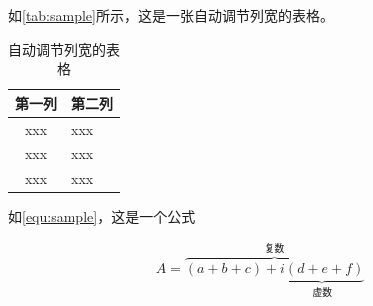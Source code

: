 \par 如\autoref{tab:sample}所示，这是一张自动调节列宽的表格。

\begin{table}[htbp]
    \caption{\label{tab:sample}自动调节列宽的表格}
    \begin{tabularx}{\linewidth}{c|X<{\centering}}
        \hline
        第一列 & 第二列 \\ \hline
        xxx & xxx \\ \hline
        xxx & xxx \\ \hline
        xxx & xxx \\ \hline
    \end{tabularx}
\end{table}


\par 如\autoref{equ:sample}，这是一个公式

\begin{equation}
    \label{equ:sample}
    A=\overbrace{(a+b+c)+\underbrace{i(d+e+f)}_{\text{虚数}}}^{\text{复数}}
\end{equation}




